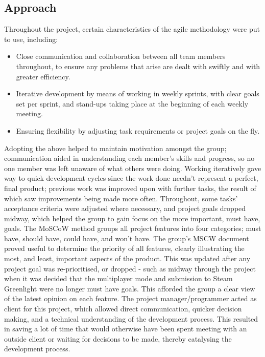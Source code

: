 \documentclass[12pt]{article}
\begin{document}
\subsection{Approach}
Throughout the project, certain characteristics of the agile methodology were put to use, including:
\begin{itemize}
	\item Close communication and collaboration between all team members throughout, to ensure any problems that arise are dealt with swiftly and with greater efficiency.
	\item Iterative development by means of working in weekly sprints, with clear goals set per sprint, and stand-ups taking place at the beginning of each weekly meeting.
	\item Ensuring flexibility by adjusting task requirements or project goals on the fly. 
\end{itemize}
Adopting the above helped to maintain motivation amongst the group; communication aided in understanding each member's skills and progress, so no one member was left unaware of what others were doing. Working iteratively gave way to quick development cycles since the work done needn't represent a perfect, final product; previous work was improved upon with further tasks, the result of which saw improvements being made more often. Throughout, some tasks' acceptance criteria were adjusted where necessary, and project goals dropped midway, which helped the group to gain focus on the more important, must have, goals.  
\newline
\newline
The MoSCoW method groups all project features into four categories; must have, should have, could have, and won't have. The group's MSCW document proved useful to determine the priority of all features, clearly illustrating the most, and least, important aspects of the product. This was updated after any project goal was re-prioritised, or dropped - such as midway through the project when it was decided that the multiplayer mode and submission to Steam Greenlight were no longer must have goals. This afforded the group a clear view of the latest opinion on each feature. 
\newline
\newline
The project manager/programmer acted as client for this project, which allowed direct communication, quicker decision making, and a technical understanding of the development process. This resulted in saving a lot of time that would otherwise have been spent meeting with an outside client or waiting for decisions to be made, thereby catalysing the development process.
\end{document}
